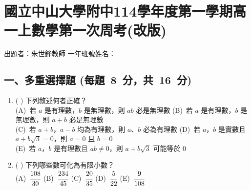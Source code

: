 \documentclass[b4paper,12pt]{exam}
\newcommand{\anslabel}[1]{%
  \makebox[3em][c]{%
    \ifshowAnswer{\color{red}#1}\else\phantom{#1}\fi
  }%
}
\newcommand\testTitle[1]{\section*{#1}}
\newcommand\testSubsection[3]{\subsection*{#1 (每題\ #2\ 分，共\ #3\ 分)}}
\newif\ifshowAnswer
\begin{document}

{\centering
\testTitle{國立中山大學附中114學年度第一學期高一上數學第一次周考(改版)}
}

出題者：{朱世鋒}\quad 教師 \hfill 一年\hspace{2em}班\hspace{2em}號\quad 姓名：\hspace{6em}\quad\\
\vspace{0.5em}


\testSubsection{一、多重選擇題}{8}{16}
\begin{enumerate}[itemsep=0.5em, topsep=1em,
                  label=\arabic*.]
    \item(\anslabel{BC}) 下列敘述何者正確？\\[.5em]
        (A)~{若 $a$ 是有理數，$b$ 是無理數，則 $ab$ 必是無理數}\hspace{.5em}
        (B)~{若 $a$ 是有理數，$b$ 是無理數，則 $a+b$ 必是無理數}\\[.5em]
        (C)~{若 $a+b$，$a-b$ 均為有理數，則 $a$、$b$ 必為有理數}\hspace{.5em}
        (D)~{若 $a$，$b$ 是實數且 $a+b\sqrt{3}=0$，則 $a=0$ 且 $b=0$}\\[.5em]
        (E)~{若 $a$，$b$ 是有理數且 $ab\neq0$，則 $a+b\sqrt{3}$ 可能等於 $0$}

    \item(\anslabel{AB}) 下列哪些數可化為有限小數？\\[.5em]
        (A)~{$\cfrac{108}{30}$}\hspace{1.5em}
        (B)~{$\cfrac{234}{45}$}\hspace{1.5em}
        (C)~{$\cfrac{20}{35}$}\hspace{1.5em}
        (D)~{$\cfrac{5}{22}$}\hspace{1.5em}
        (E)~{$\cfrac{9}{108}$}\\
\end{enumerate}
\end{document}
